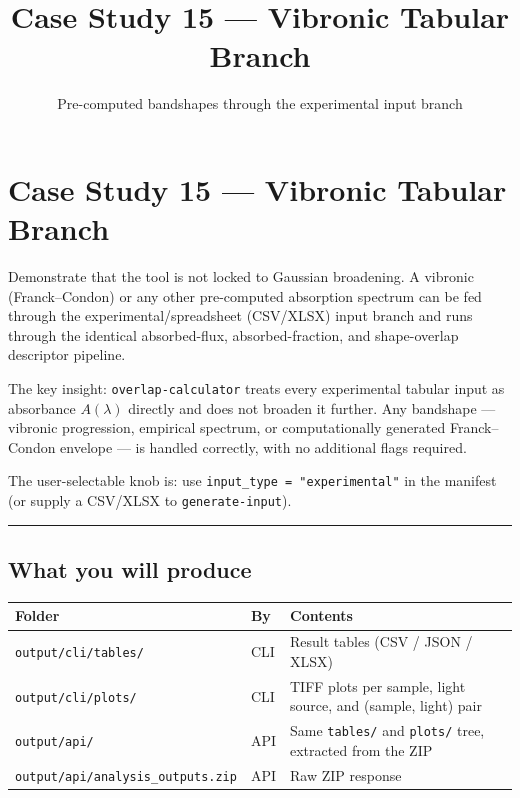 \documentclass[
  11pt,
]{article}
\title{Case Study 15 --- Vibronic Tabular Branch}
\subtitle{Pre-computed bandshapes through the experimental input branch}
\author{}
\date{}
\begin{document}
\maketitle

{
\hypersetup{linkcolor=}
\setcounter{tocdepth}{2}
\tableofcontents
}
\hypertarget{case-study-15--vibronic-tabular-branch}{
\section{Case Study 15 --- Vibronic Tabular
Branch}\label{case-study-15--vibronic-tabular-branch}}

Demonstrate that the tool is not locked to Gaussian broadening. A
vibronic (Franck--Condon) or any other pre-computed absorption spectrum
can be fed through the experimental/spreadsheet (CSV/XLSX) input branch
and runs through the identical absorbed-flux, absorbed-fraction, and
shape-overlap descriptor pipeline.

The key insight: \texttt{overlap-calculator} treats every experimental
tabular input as absorbance \(A(\lambda)\) directly and does not broaden
it further. Any bandshape --- vibronic progression, empirical spectrum,
or computationally generated Franck--Condon envelope --- is handled
correctly, with no additional flags required.

The user-selectable knob is: use \texttt{input\_type = "experimental"}
in the manifest (or supply a CSV/XLSX to \texttt{generate-input}).

\begin{center}\rule{0.5\linewidth}{0.5pt}\end{center}

\hypertarget{what-you-will-produce}{
\subsection{What you will produce}\label{what-you-will-produce}}

\begin{longtable}[]{@{}lll@{}}
\toprule
Folder & By & Contents \\
\midrule
\endhead
\texttt{output/cli/tables/} & CLI & Result tables (CSV / JSON / XLSX) \\
\texttt{output/cli/plots/} & CLI & TIFF plots per sample, light source,
and (sample, light) pair \\
\texttt{output/api/} & API & Same \texttt{tables/} and \texttt{plots/}
tree, extracted from the ZIP \\
\texttt{output/api/analysis\_outputs.zip} & API & Raw ZIP response \\
\bottomrule
\end{longtable}
\end{document}
